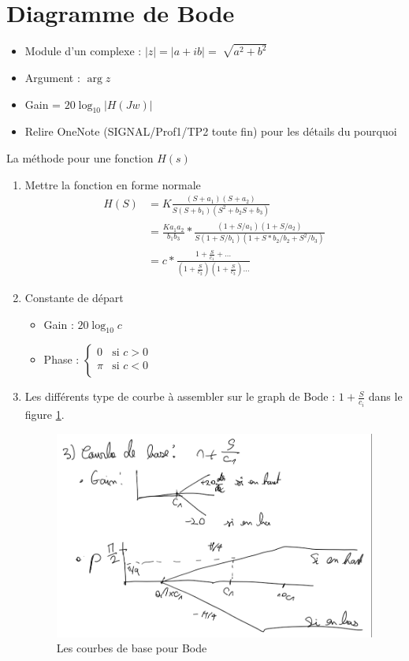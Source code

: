\documentclass{article}
\theoremstyle{plain}%
\theoremstyle{definition}
\theoremstyle{remark}
\begin{document}
\section{Diagramme de Bode}
\begin{itemize}
    \item Module d'un complexe : $ \left| z \right| = \left| a + ib \right| = \sqrt[]{a^2 + b^2} $ 
    \item Argument : $ \arg z $ 
    \item Gain = $ 20 \log_{10} \left| H(Jw) \right| $
    \item Relire OneNote (SIGNAL/Prof1/TP2 toute fin) pour les détails du pourquoi 
\end{itemize}
La méthode pour une fonction $ H(s) $ 
\begin{enumerate}
    \item Mettre la fonction en forme normale 
    \begin{align*}
        H(S) &= K \frac{(S + a_1)(S+a_2)}{S(S+b_1)(S^2 + b_2 S + b_3)} \\
            &= \frac{K a_1 a_2}{b_1 b_3} * \frac{(1 + S/a_1)(1+S/a_2)}{S(1+S/b_1)(1 + S*b_2/b_2 + S^2/b_3)} \\ 
            &= c * \frac{1 + \frac{S}{c_1} + \dots}{(1 + \frac{S}{c_2})(1 + \frac{S}{c_3})\dots}
    \end{align*}
    \item Constante de départ \begin{itemize}
        \item Gain : $ 20 \log_{10} c $ 
        \item Phase : $ \begin{cases}
        0 &\text{si } c>0 \\
        \pi  &\text{si }c < 0 \\
        \end{cases}  $ 
    \end{itemize} 
    \item Les différents type de courbe à assembler sur le graph de Bode : $ 1 + \frac{S}{c_i} $ dans le figure \ref{bode}.
    \begin{figure}[!htbp]
        \centering
        \includegraphics*[width=.5\textwidth]{./bode.png}
        \caption{Les courbes de base pour Bode}
        \label{bode}
    \end{figure}
\end{enumerate}
\end{document}
